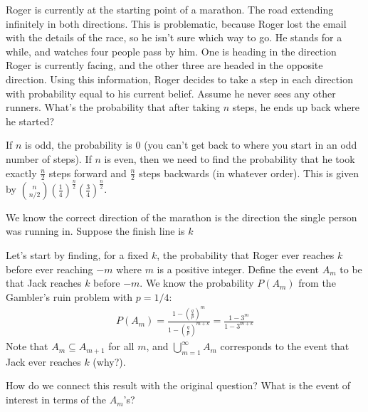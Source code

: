 \documentclass[11pt]{article}
\begin{document}
\begin{exercise}
Roger is currently at the starting point of a marathon. The road extending infinitely in both directions. This is problematic, because Roger lost the email with the details of the race, so he isn't sure which way to go. He stands for a while, and watches four people pass by him. One is heading in the direction Roger is currently facing, and the other three are headed in the opposite direction. Using this information, Roger decides to take a step in each direction with probability equal to his current belief. Assume he never sees any other runners. What's the probability that after taking $n$ steps, he ends up back where he started?
\end{exercise}
\begin{solution}
If $n$ is odd, the probability is $0$ (you can't get back to where you start in an odd number of steps).
If $n$ is even, then we need to find the probability that he took exactly $\frac{n}{2}$ steps forward and $\frac{n}{2}$ steps backwards (in whatever order). This is given by ${n \choose n/2}\left(\frac{1}{4}\right)^{\frac{n}{2}}\left(\frac{3}{4} \right)^{\frac{n}{2}}$.
\end{solution}

\begin{exercise}
We know the correct direction of the marathon is the direction the single person was running in. Suppose the finish line is $k$
\end{exercise}
\begin{solution}
Let’s start by finding, for a fixed $k$, the probability that Roger ever reaches $k$ before ever reaching
$−m$ where $m$ is a positive integer. Define the event $A_m$ to be that Jack reaches $k$ before $−m$. We
know the probability $P(A_m)$ from the Gambler’s ruin problem with $p = 1/4$:
\begin{align*}
P(A_m) = \frac{1 - \left(\frac{q}{p} \right)^m}{1 - \left(\frac{q}{p} \right)^{m+k}} = \frac{1 - 3^m}{1-3^{m+k}}
\end{align*}
Note that $A_m \subseteq A_{m+1}$ for all $m$, and $\bigcup_{m=1}^{\infty} A_m$ corresponds to the event that Jack ever reaches $k$ (why?).

How do we connect this result with the original question? What is the event of interest in terms
of the $A_m$'s?
\end{solution}
\end{document}
